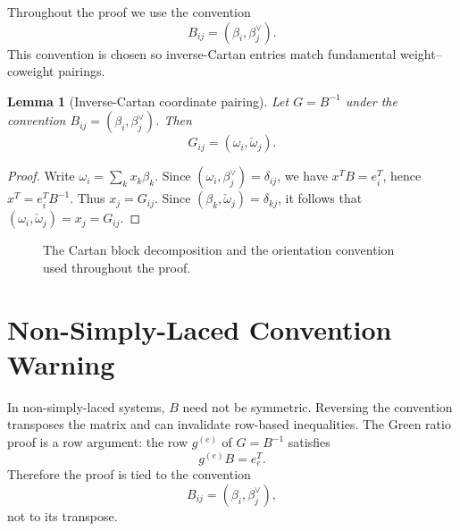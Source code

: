 \documentclass[11pt]{book}
\newtheorem{lemma}[theorem]{Lemma}
\theoremstyle{definition}
\begin{document}
Throughout the proof we use the convention
\[
 \boxed{B_{ij}=(\beta_i,\beta_j^\vee).}
\]
This convention is chosen so inverse-Cartan entries match fundamental weight--coweight pairings.

\begin{lemma}[Inverse-Cartan coordinate pairing]\label{lem:pairing}
Let $G=B^{-1}$ under the convention $B_{ij}=(\beta_i,\beta_j^\vee)$. Then
\[
 G_{ij}=(\omega_i,\check\omega_j).
\]
\end{lemma}
\begin{proof}
Write $\omega_i=\sum_k x_k\beta_k$. Since $(\omega_i,\beta_j^\vee)=\delta_{ij}$, we have $x^T B=e_i^T$, hence $x^T=e_i^T B^{-1}$. Thus $x_j=G_{ij}$. Since $(\beta_k,\check\omega_j)=\delta_{kj}$, it follows that $(\omega_i,\check\omega_j)=x_j=G_{ij}$.
\end{proof}

\begin{figure}[h]
\centering
{}
\caption{The Cartan block decomposition and the orientation convention used throughout the proof.}
\end{figure}

\chapter{Non-Simply-Laced Convention Warning}
In non-simply-laced systems, $B$ need not be symmetric. Reversing the convention transposes the matrix and can invalidate row-based inequalities. The Green ratio proof is a row argument: the row $g^{(e)}$ of $G=B^{-1}$ satisfies
\[
 g^{(e)}B=e_e^T.
\]
Therefore the proof is tied to the convention
\[
 B_{ij}=(\beta_i,\beta_j^\vee),
\]
not to its transpose.
\end{document}
